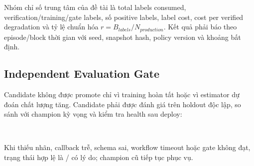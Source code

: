 Nhóm chỉ số trung tâm của đề tài là total labels consumed, verification/training/gate labels, số positive labels, label cost, cost per verified degradation và tỷ lệ chuẩn hóa \(r=B_{labels}/N_{production}\). Kết quả phải báo theo episode/block thời gian với seed, snapshot hash, policy version và khoảng bất định.

\subsection{Independent Evaluation Gate}

Candidate không được promote chỉ vì training hoàn tất hoặc vì estimator dự đoán chất lượng tăng. Candidate phải được đánh giá trên holdout độc lập, so sánh với champion kỳ vọng và kiểm tra health sau deploy:

\begin{center}
\\
\end{center}

Khi thiếu nhãn, callback trễ, schema sai, workflow timeout hoặc gate không đạt, trạng thái hợp lệ là / có lý do; champion cũ tiếp tục phục vụ.


